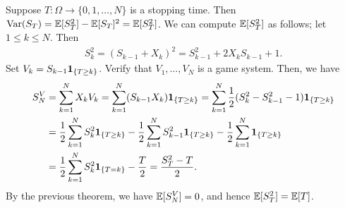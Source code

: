Suppose $T:\Omega \to \{0,1,\ldots,N\}$ is a stopping time. Then $\operatorname{Var}(S_{T}) = \mathbb{E}[S_{T}^{2}] - \mathbb{E}[S_{T}]^{2} = \mathbb{E}[S_{T}^{2}]$. We can compute $\mathbb{E}[S_{T}^{2}]$ as follows; let $1 \leq k \leq N$. Then
\begin{align}
    S_{k}^{2} = (S_{k-1}+X_{k})^{2} = S_{k-1}^{2} + 2X_{k}S_{k-1} + 1.
\end{align}
Set $V_{k} = S_{k-1}\textbf{1}_{\{T \geq k\}}$. Verify that $V_{1},\ldots,V_{N}$ is a game system. Then, we have
\begin{align}
    S_{N}^{V} &= \sum_{k=1}^{N} X_{k}V_{k} = \sum_{k=1}^{N} (S_{k-1}X_{k}) \textbf{1}_{\{T \geq k\}} = \sum_{k=1}^{N} \frac{1}{2}(S_{k}^{2} - S_{k-1}^{2}-1)\textbf{1}_{\{T \geq k\}} \notag \\
    &= \frac{1}{2}\sum_{k=1}^{N} S_{k}^{2} \textbf{1}_{\{T \geq k\}} - \frac{1}{2} \sum_{k=1}^{N} S_{k-1}^{2} \textbf{1}_{\{T \geq k\}} - \frac{1}{2}\sum_{k=1}^{N} \textbf{1}_{\{T \geq k\}} \notag \\
    &= \frac{1}{2}\sum_{k=1}^{N} S_{k}^{2} \textbf{1}_{\{T=k\}} - \frac{T}{2} = \frac{S_{T}^{2}-T}{2}.
\end{align}
By the previous theorem, we have $\mathbb{E}[S_{N}^{V}] = 0$, and hence $\mathbb{E}[S_{T}^{2}] = \mathbb{E}[T]$. 

